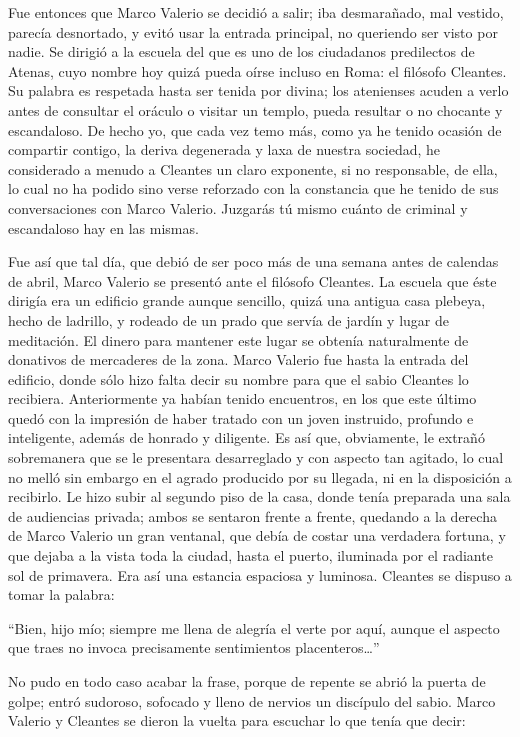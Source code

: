 \documentclass[11pt,openany]{book}
\begin{document}
Fue entonces que Marco Valerio se decidió a salir; iba desmarañado, mal vestido, parecía desnortado, y evitó usar la entrada principal, no queriendo ser visto por nadie. Se dirigió a la escuela del que es uno de los ciudadanos predilectos de Atenas, cuyo nombre hoy quizá pueda oírse incluso en Roma: el filósofo Cleantes. Su palabra es respetada hasta ser tenida por divina; los atenienses acuden a verlo antes de consultar el oráculo o visitar un templo, pueda resultar o no chocante y escandaloso. De hecho yo, que cada vez temo más, como ya he tenido ocasión de compartir contigo, la deriva degenerada y laxa de nuestra sociedad, he considerado a menudo a Cleantes un claro exponente, si no responsable, de ella, lo cual no ha podido sino verse reforzado con la constancia que he tenido de sus conversaciones con Marco Valerio. Juzgarás tú mismo cuánto de criminal y escandaloso hay en las mismas. 

Fue así que tal día, que debió de ser poco más de una semana antes de calendas de abril, Marco Valerio se presentó ante el filósofo Cleantes. La escuela que éste dirigía era un edificio grande aunque sencillo, quizá una antigua casa plebeya, hecho de ladrillo, y rodeado de un prado que servía de jardín y lugar de meditación. El dinero para mantener este lugar se obtenía naturalmente de donativos de mercaderes de la zona. Marco Valerio fue hasta la entrada del edificio, donde sólo hizo falta decir su nombre para que el sabio Cleantes lo recibiera. Anteriormente ya habían tenido encuentros, en los que este último quedó con la impresión de haber tratado con un joven instruido, profundo e inteligente, además de honrado y diligente. Es así que, obviamente, le extrañó sobremanera que se le presentara desarreglado y con aspecto tan agitado, lo cual no melló sin embargo en el agrado producido por su llegada, ni en la disposición a recibirlo. Le hizo subir al segundo piso de la casa, donde tenía preparada una sala de audiencias privada; ambos se sentaron frente a frente, quedando a la derecha de Marco Valerio un gran ventanal, que debía de costar una verdadera fortuna, y que dejaba a la vista toda la ciudad, hasta el puerto, iluminada por el radiante sol de primavera. Era así una estancia espaciosa y luminosa. Cleantes se dispuso a tomar la palabra: 

“Bien, hijo mío; siempre me llena de alegría el verte por aquí, aunque el aspecto que traes no invoca precisamente sentimientos placenteros\dots” 

No pudo en todo caso acabar la frase, porque de repente se abrió la puerta de golpe; entró sudoroso, sofocado y lleno de nervios un discípulo del sabio. Marco Valerio y Cleantes se dieron la vuelta para escuchar lo que tenía que decir: 
\end{document}
